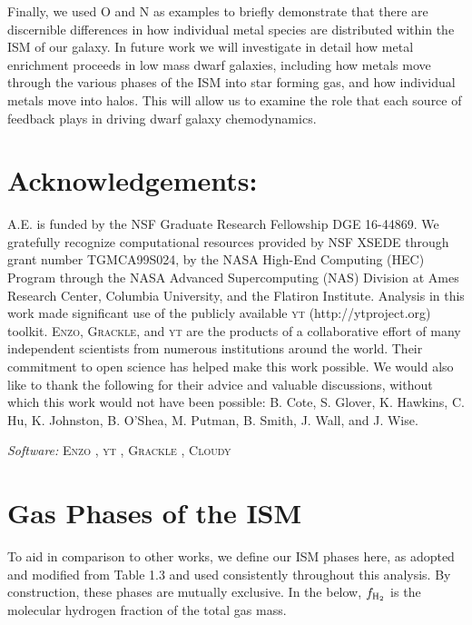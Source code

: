 \documentclass[twocolumn]{aastex61}
\begin{document}
Finally, we used O and N as examples to briefly demonstrate that there are discernible differences in how individual metal species are distributed within the ISM of our galaxy. In future work we will investigate in detail how metal enrichment proceeds in low mass dwarf galaxies, including how metals move through the various phases of the ISM into star forming gas, and how individual metals move into halos. This will allow us to examine
the role that each source of feedback plays in driving dwarf galaxy chemodynamics.

\section*{Acknowledgements:} A.E. is funded by the NSF Graduate Research Fellowship DGE 16-44869. 
We gratefully recognize computational
resources provided by NSF XSEDE through grant number TGMCA99S024, by the NASA High-End Computing (HEC) Program through the NASA Advanced Supercomputing (NAS) Division at Ames Research Center, Columbia University, and the Flatiron Institute. Analysis in this work
made significant use of the publicly available \textsc{yt} (http://ytproject.org)
toolkit. \textsc{Enzo}, \textsc{Grackle}, and \textsc{yt} are the products of a collaborative effort of many independent scientists from numerous institutions around
the world. Their commitment to open science has helped make
this work possible. We would also like to thank the following for their advice and valuable discussions, without which this work would not have been possible: B. Cote, S. Glover, K. Hawkins, C. Hu, K. Johnston, B. O'Shea, M. Putman, B. Smith, J. Wall, and J. Wise.

\textit{Software:} \textsc{Enzo} \citep{Enzo2014}, \textsc{yt} \citep{yt}, \textsc{Grackle} \citep{GrackleMethod}, \textsc{Cloudy} \citep{Cloudy2013}
%
%




\appendix
\renewcommand\thefigure{\thesection.\arabic{figure}}    
\setcounter{figure}{0}

\section{Gas Phases of the ISM}
\label{appendix:phases}

To aid in comparison to other works, we define our ISM phases here, as adopted and modified from \citet{Draine2011} Table 1.3 and used consistently throughout this analysis. By construction, these phases are mutually exclusive. In the below, $f_{\rm H_2}$ is the molecular hydrogen fraction of the total gas mass.
\end{document}
